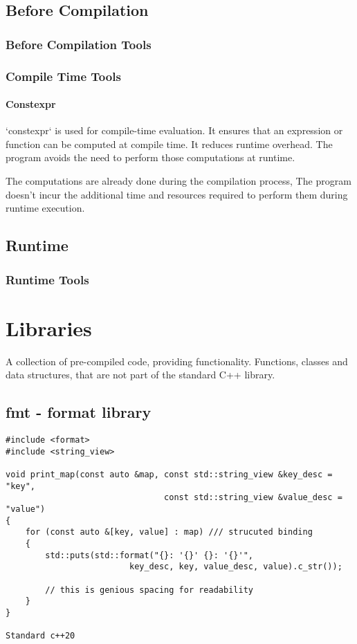 \section{Before Compilation}

\subsection{Before Compilation Tools}


\subsection{Compile Time Tools}

\subsubsection{Constexpr}

`constexpr` is used for compile-time evaluation.
It ensures that an expression or function can be computed at compile time.
It reduces runtime overhead.
The program avoids the need to perform those computations at runtime. 

The computations are already done during the compilation process, 
The program doesn't incur the additional time and resources required
to perform them during runtime execution.

\section{Runtime}

\subsection{Runtime Tools}


\chapter{Libraries}

A collection of pre-compiled code, providing functionality. Functions, classes and data structures,
that are not part of the standard C++ library.

\section{fmt - format library}

\begin{verbatim}
#include <format>
#include <string_view>

void print_map(const auto &map, const std::string_view &key_desc = "key",
                                const std::string_view &value_desc = "value")
{
    for (const auto &[key, value] : map) /// strucuted binding
    {
        std::puts(std::format("{}: '{}' {}: '{}'",
                         key_desc, key, value_desc, value).c_str());

        // this is genious spacing for readability
    }
}

Standard c++20
\end{verbatim}
